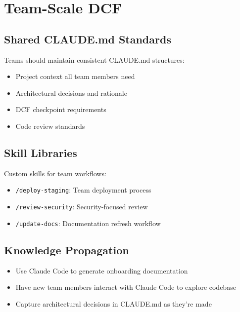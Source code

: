 \chapter{Team-Scale DCF}

\section{Shared CLAUDE.md Standards}

Teams should maintain consistent CLAUDE.md structures:
\begin{itemize}
    \item Project context all team members need
    \item Architectural decisions and rationale
    \item DCF checkpoint requirements
    \item Code review standards
\end{itemize}

\section{Skill Libraries}

Custom skills for team workflows:
\begin{itemize}
    \item \texttt{/deploy-staging}: Team deployment process
    \item \texttt{/review-security}: Security-focused review
    \item \texttt{/update-docs}: Documentation refresh workflow
\end{itemize}

\section{Knowledge Propagation}

\begin{itemize}
    \item Use Claude Code to generate onboarding documentation
    \item Have new team members interact with Claude Code to explore codebase
    \item Capture architectural decisions in CLAUDE.md as they're made
\end{itemize}

